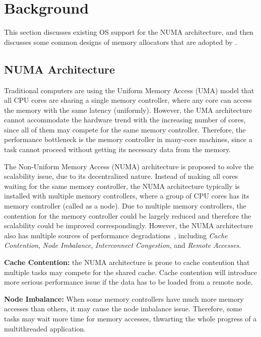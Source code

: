\section{Background}
\label{sec:overview}

This section discusses existing OS support for the NUMA architecture, and then discusses some common designs of memory allocators that are adopted by \NM{}.  

\subsection{NUMA Architecture}

\label{sec:numa}

Traditional computers are using the Uniform Memory Access (UMA) model that all CPU cores are sharing a single memory controller, where any core can access the memory with the same latency (uniformly). However, the UMA architecture cannot accommodate the hardware trend with the increasing number of cores, since all of them may compete for the same memory controller. Therefore, the performance bottleneck is the memory controller in many-core machines, since a task cannot proceed without getting its necessary data from the memory. 

The Non-Uniform Memory Access (NUMA) architecture is proposed to solve the scalability issue, due to its decentralized nature. Instead of making all cores waiting for the same memory controller, the NUMA architecture typically is installed with multiple memory controllers, where a group of CPU cores has its memory controller (called as a node). Due to multiple memory controllers, the contention for the memory controller could be largely reduced and therefore the scalability could be improved correspondingly. However, the NUMA architecture also has multiple sources of performance degradations~\citep{Blagodurov:2011:CNC:2002181.2002182}, including \textit{Cache Contention}, \textit{Node Imbalance}, \textit{Interconnect Congestion}, and \textit{Remote Accesses}. 

\textbf{Cache Contention:} the NUMA architecture is prone to cache contention that multiple tasks may compete for the shared cache. Cache contention will introduce more serious performance issue if the data has to be loaded from a remote node. 
 
\textbf{Node Imbalance:} When some memory controllers have much more memory accesses than others, it may cause the node imbalance issue. Therefore, some tasks may wait more time for memory accesses, thwarting the whole progress of a multithreaded application.  

